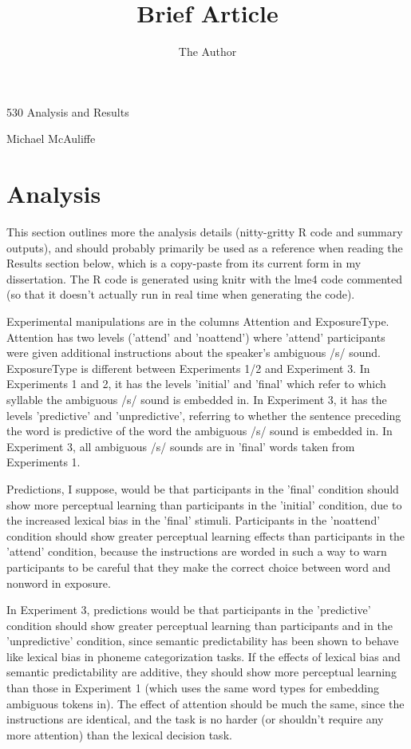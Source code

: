 \documentclass[11pt]{article}\usepackage[]{graphicx}\usepackage[]{color}
\title{Brief Article}
\author{The Author}
\begin{document}
\begin{center}
530 Analysis and Results

Michael McAuliffe
\end{center}

\section{Analysis}

This section outlines more the analysis details (nitty-gritty R code and summary outputs), and should probably primarily be used as a reference when reading the Results section below, which is a copy-paste from its current form in my dissertation.  The R code is generated using knitr with the lme4 code commented (so that it doesn't actually run in real time when generating the code).

Experimental manipulations are in the columns Attention and ExposureType.  Attention has two levels ('attend' and 'noattend') where 'attend' participants were given additional instructions about the speaker's ambiguous /s/ sound.  ExposureType is different between Experiments 1/2 and Experiment 3.  In Experiments 1 and 2, it has the levels 'initial' and 'final' which refer to which syllable the ambiguous /s/ sound is embedded in.  In Experiment 3, it has the levels 'predictive' and 'unpredictive', referring to whether the sentence preceding the word is predictive of the word the ambiguous /s/ sound is embedded in.  In Experiment 3, all ambiguous /s/ sounds are in 'final' words taken from Experiments 1.

Predictions, I suppose, would be that participants in the 'final' condition should show more perceptual learning than participants in the 'initial' condition, due to the increased lexical bias in the 'final' stimuli.  Participants in the 'noattend' condition should show greater perceptual learning effects than participants in the 'attend' condition, because the instructions are worded in such a way to warn participants to be careful that they make the correct choice between word and nonword in exposure.

In Experiment 3, predictions would be that participants in the 'predictive' condition should show greater perceptual learning than participants and in the 'unpredictive' condition, since semantic predictability has been shown to behave like lexical bias in phoneme categorization tasks.  If the effects of lexical bias and semantic predictability are additive, they should show more perceptual learning than those in Experiment 1 (which uses the same word types for embedding ambiguous tokens in).  The effect of attention should be much the same, since the instructions are identical, and the task is no harder (or shouldn't require any more attention) than the lexical decision task.
\end{document}
